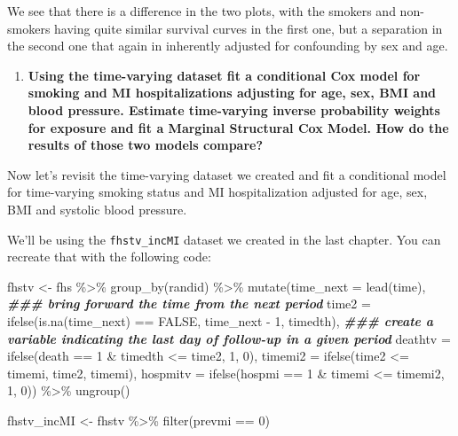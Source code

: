 \documentclass[
]{book}
\newenvironment{Shaded}{\begin{snugshade}}{\end{snugshade}}
\newcommand{\AttributeTok}[1]{\textcolor[rgb]{0.77,0.63,0.00}{#1}}
\newcommand{\ConstantTok}[1]{\textcolor[rgb]{0.00,0.00,0.00}{#1}}
\newcommand{\DecValTok}[1]{\textcolor[rgb]{0.00,0.00,0.81}{#1}}
\newcommand{\DocumentationTok}[1]{\textcolor[rgb]{0.56,0.35,0.01}{\textbf{\textit{#1}}}}
\newcommand{\FunctionTok}[1]{\textcolor[rgb]{0.00,0.00,0.00}{#1}}
\newcommand{\NormalTok}[1]{#1}
\newcommand{\OtherTok}[1]{\textcolor[rgb]{0.56,0.35,0.01}{#1}}
\newcommand{\SpecialCharTok}[1]{\textcolor[rgb]{0.00,0.00,0.00}{#1}}
\providecommand{\tightlist}{%
  \setlength{\itemsep}{0pt}\setlength{\parskip}{0pt}}
\begin{document}
We see that there is a difference in the two plots, with the smokers and non-smokers having quite similar survival curves in the first one, but a separation in the second one that again in inherently adjusted for confounding by sex and age.

\begin{enumerate}
\def\labelenumi{\arabic{enumi}.}
\setcounter{enumi}{2}
\tightlist
\item
  \textbf{Using the time-varying dataset fit a conditional Cox model for smoking and MI hospitalizations adjusting for age, sex, BMI and blood pressure. Estimate time-varying inverse probability weights for exposure and fit a Marginal Structural Cox Model. How do the results of those two models compare?}
\end{enumerate}

Now let's revisit the time-varying dataset we created and fit a conditional model for time-varying smoking status and MI hospitalization adjusted for age, sex, BMI and systolic blood pressure.

We'll be using the \texttt{fhstv\_incMI} dataset we created in the last chapter. You can recreate that with the following code:

\begin{Shaded}
\begin{Highlighting}[]
\NormalTok{fhstv }\OtherTok{\textless{}{-}}\NormalTok{ fhs }\SpecialCharTok{\%\textgreater{}\%}
  \FunctionTok{group\_by}\NormalTok{(randid) }\SpecialCharTok{\%\textgreater{}\%}
  \FunctionTok{mutate}\NormalTok{(}\AttributeTok{time\_next =} \FunctionTok{lead}\NormalTok{(time), }\DocumentationTok{\#\#\# bring forward the time from the next period}
         \AttributeTok{time2 =} \FunctionTok{ifelse}\NormalTok{(}\FunctionTok{is.na}\NormalTok{(time\_next) }\SpecialCharTok{==} \ConstantTok{FALSE}\NormalTok{,}
\NormalTok{                        time\_next }\SpecialCharTok{{-}} \DecValTok{1}\NormalTok{,}
\NormalTok{                        timedth), }\DocumentationTok{\#\#\# create a variable indicating the last day of follow{-}up in a given period}
         \AttributeTok{deathtv =} \FunctionTok{ifelse}\NormalTok{(death }\SpecialCharTok{==} \DecValTok{1} \SpecialCharTok{\&}\NormalTok{ timedth }\SpecialCharTok{\textless{}=}\NormalTok{ time2, }\DecValTok{1}\NormalTok{, }\DecValTok{0}\NormalTok{),}
         \AttributeTok{timemi2 =} \FunctionTok{ifelse}\NormalTok{(time2 }\SpecialCharTok{\textless{}=}\NormalTok{ timemi, time2, timemi),}
         \AttributeTok{hospmitv =} \FunctionTok{ifelse}\NormalTok{(hospmi }\SpecialCharTok{==} \DecValTok{1} \SpecialCharTok{\&}\NormalTok{ timemi }\SpecialCharTok{\textless{}=}\NormalTok{ timemi2, }\DecValTok{1}\NormalTok{, }\DecValTok{0}\NormalTok{)) }\SpecialCharTok{\%\textgreater{}\%} 
  \FunctionTok{ungroup}\NormalTok{()}

\NormalTok{fhstv\_incMI }\OtherTok{\textless{}{-}}\NormalTok{ fhstv }\SpecialCharTok{\%\textgreater{}\%}
  \FunctionTok{filter}\NormalTok{(prevmi }\SpecialCharTok{==} \DecValTok{0}\NormalTok{) }
\end{Highlighting}
\end{Shaded}
\end{document}
